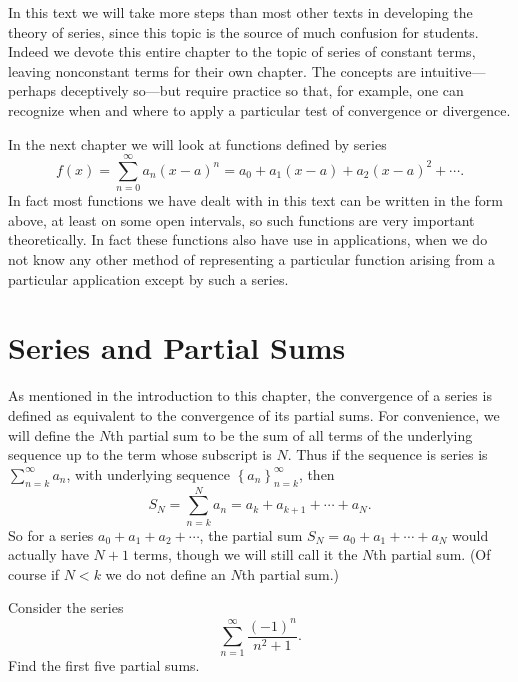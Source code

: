 In this text we will take more steps than most other texts in developing
the theory of series, since this topic is the source of much
confusion for students.  Indeed we devote this entire chapter
to the topic of series of constant terms, leaving nonconstant
terms for their own chapter.  The concepts are 
intuitive---perhaps deceptively so---but require practice so that,
for example, one can recognize when and where to apply a particular
test of convergence or divergence.

In the next chapter
we will look at functions defined by series
$$f(x)=\sum_{n=0}^\infty a_n(x-a)^n
  =a_0+a_1(x-a)+a_2(x-a)^2+\cdots.$$
In fact most functions we have dealt  with in this text can be written
in the form above, at least on some open intervals, so such functions are
very important theoretically. In fact
these functions also have use in applications, when we do not know
any other method of representing a particular function arising
from a particular application except by such a series.


\newpage
\section{Series and Partial Sums}
As mentioned in the introduction to this chapter, the convergence
of a series is defined  as equivalent to the convergence of its 
partial sums.  
For convenience, we will define the $N$th partial sum
to be the sum of all terms of the underlying sequence up to
the term whose subscript is $N$.  Thus if the sequence is
series is $\sum_{n=k}^\infty a_n$, with
underlying sequence $\left\{a_n\right\}_{n=k}^\infty$, then
\begin{equation}
S_N=\sum_{n=k}^N a_n=a_k+a_{k+1}+\cdots+a_N.\end{equation}
So for a series $a_0+a_1+a_2+\cdots$, the partial
sum $S_N=a_0+a_1+\cdots+a_N$ would actually have $N+1$ terms,
though we will still call it the $N$th partial sum. (Of course
if $N<k$ we do not define an $N$th partial sum.)

\bex Consider the series
$$\sum_{n=1}^\infty \frac{(-1)^n}{n^2+1}.$$
Find the first five partial sums.

